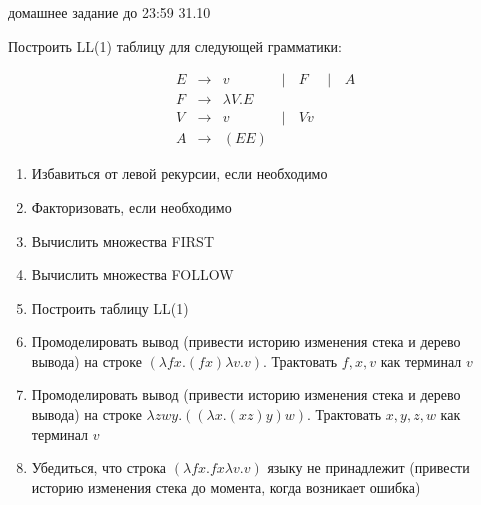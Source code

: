 \documentclass[12pt]{article}
\begin{document}

{\Large домашнее задание до 23:59 31.10}
\bigskip

\enumerate
{
  \item
  
    Построить LL(1) таблицу для следующей грамматики:
    
    $$
    \begin{array}{cccccccc}
       &E  & \rightarrow & v & \, | \, &  F &  \, | \, &  A \\
       &F  & \rightarrow & \lambda V . E \\
       &V & \rightarrow & v &  \, | \, & V v \\
       &A  & \rightarrow & (E E)   
    \end{array}
    $$
    
    \begin{enumerate}
        \item Избавиться от левой рекурсии, если необходимо
        \item Факторизовать, если необходимо 
        \item Вычислить множества FIRST
        \item Вычислить множества FOLLOW
        \item Построить таблицу LL(1)
        \item Промоделировать вывод (привести историю изменения стека и дерево вывода) на строке $(\lambda f x. (f x) \lambda v.v)$. Трактовать $f,x,v$ как терминал $v$
        \item Промоделировать вывод (привести историю изменения стека и дерево вывода) на строке $\lambda zwy. ((\lambda x.  (x z) y) w)$. Трактовать $x,y,z,w$ как терминал $v$
        \item Убедиться, что строка $(\lambda f x. f x \lambda v.v)$ языку не принадлежит (привести историю изменения стека до момента, когда возникает ошибка)
    \end{enumerate} 
}
\end{document}
